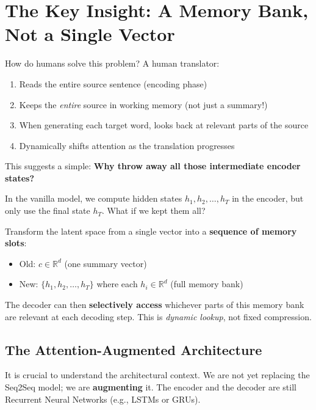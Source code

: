 \documentclass{article}
\begin{document}
\section{The Key Insight: A Memory Bank, Not a Single Vector}

How do humans solve this problem? A human translator:
\begin{enumerate}
    \item Reads the entire source sentence (encoding phase)
    \item Keeps the \textit{entire} source in working memory (not just a summary!)
    \item When generating each target word, looks back at relevant parts of the source
    \item Dynamically shifts attention as the translation progresses
\end{enumerate}

This suggests a simple: \textbf{Why throw away all those intermediate encoder states?}

In the vanilla model, we compute hidden states $h_1, h_2, \ldots, h_T$ in the encoder, but only use the final state $h_T$. What if we kept them all?

\begin{tcolorbox}[colback=green!5!white, colframe=green!50!black, title=Dynamic Memory Access]
Transform the latent space from a single vector into a \textbf{sequence of memory slots}:
\begin{itemize}
    \item Old: $c \in \mathbb{R}^d$ (one summary vector)
    \item New: $\{h_1, h_2, \ldots, h_T\}$ where each $h_i \in \mathbb{R}^d$ (full memory bank)
\end{itemize}

The decoder can then \textbf{selectively access} whichever parts of this memory bank are relevant at each decoding step. This is \textit{dynamic lookup}, not fixed compression.
\end{tcolorbox}

\subsection{The Attention-Augmented Architecture}

It is crucial to understand the architectural context. We are not yet replacing the Seq2Seq model; we are \textbf{augmenting} it. The encoder and the decoder are still Recurrent Neural Networks (e.g., LSTMs or GRUs).
\end{document}
